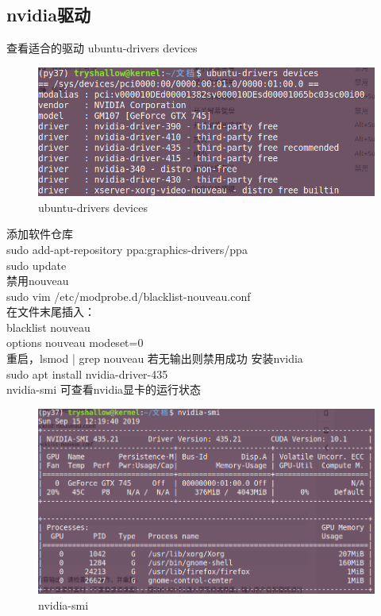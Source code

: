 \documentclass{ctexart}
\begin{document}
	\subsection{nvidia驱动}
		\noindent 查看适合的驱动
		\indent ubuntu-drivers devices	\\
		\begin{figure}[H]
			\centering
			\includegraphics[width=0.7\linewidth]{asserts/ubuntu-drivers}
			\caption{ubuntu-drivers devices}
			\label{fig:ubuntu-drivers}
		\end{figure}
		\noindent 添加软件仓库	\\
		\indent sudo add-apt-repository ppa:graphics-drivers/ppa	\\
		\indent sudo update	\\
		\noindent 禁用nouveau 	\\
		\indent sudo vim /etc/modprobe.d/blacklist-nouveau.conf	\\
		\indent 在文件末尾插入：	\\
		\indent \indent blacklist nouveau	\\
		\indent \indent options nouveau modeset=0	\\
		\indent 重启，lsmod | grep nouveau 若无输出则禁用成功
		\noindent 安装nvidia	\\
		\indent sudo apt install nvidia-driver-435 \\
		\indent nvidia-smi 可查看nvidia显卡的运行状态	\\
		\begin{figure}[H]
			\centering
			\includegraphics[width=0.7\linewidth]{asserts/nvidia-smi}
			\caption{nvidia-smi}
			\label{fig:nvidia-smi}
		\end{figure}
		
\end{document}
